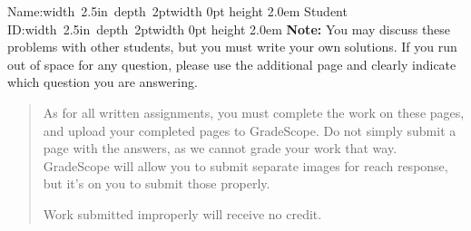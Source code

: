 \documentclass[12pt]{article}
\newcommand{\NameBlank}{\mbox{\hskip 4pt\vrule width 2.5in depth 2pt}\vrule width 0pt height 2.0em}
\begin{document}


\noindent Name:\NameBlank{}  Student ID:\NameBlank{} \newline
\textbf{Note:} You may discuss these problems with other students, but you must write your own solutions. If you run out of space for any question, please use the additional page and clearly indicate which question you are answering.
\begin{quote}
    As for all written assignments, you must complete the work on these pages, and upload your completed pages to GradeScope.  Do not simply submit a page with the answers, as we cannot grade your work that way.  GradeScope will allow you to submit separate images for reach response, but it's on you to submit those properly.

    Work submitted improperly will receive no credit.
\end{quote}
\end{document}
